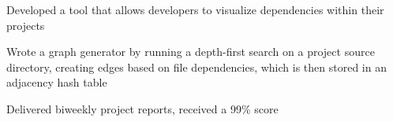 \begin{cvitemize}
\item Developed a tool that allows developers to visualize dependencies within their projects
\item Wrote a graph generator by running a depth-first search on a project source directory, creating edges based on file dependencies, which is then stored in an adjacency hash table
\item Delivered biweekly project reports, received a 99\% score
\end{cvitemize}